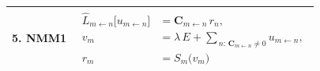 \begin{landscape}
\begin{table}[p]
{\begin{tabular}{@{}l l@{}}
    \textbf{5. NMM1 } &
    $\displaystyle
      \begin{aligned}
        \hat L_{m\leftarrow n}\!\big[u_{m\leftarrow n}\big] &=
            \mathbf{C}_{m\leftarrow n}\,r_{n}, \\[4pt]
        v_{m} &= \lambda\,E
            +\!\!\sum_{\,n:\,\mathbf{C}_{m\leftarrow n}\neq 0}\!u_{m\leftarrow n}, \\[4pt]
        r_{m} &= S_{m}\!\bigl(v_{m}\bigr)
      \end{aligned}$
    \\[1.6ex]

    \bottomrule
  \end{tabular}}%

  \normalsize
  \setlength{\tabcolsep}{6pt}
  \renewcommand{\arraystretch}{1.0}
\end{table}
\end{landscape}


